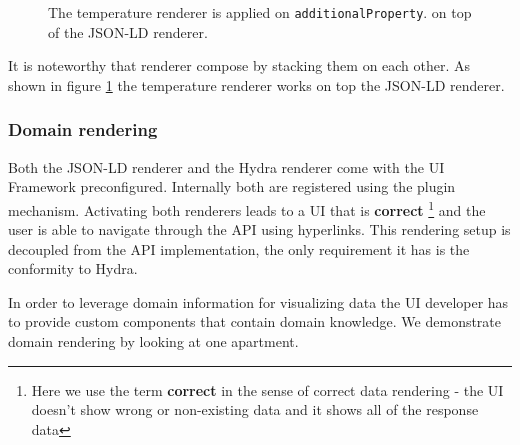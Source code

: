\begin{figure}[!htb]
  \caption{The temperature renderer is applied on \lstinline{additionalProperty}. on top of the JSON-LD renderer.}
  \label{fig:temperature}
\end{figure}

It is noteworthy that renderer compose by stacking them on each other. As shown in figure \ref{fig:temperature} the temperature renderer works on top the JSON-LD renderer.

\subsubsection{Domain rendering}
Both the JSON-LD renderer and the Hydra renderer come with the UI Framework preconfigured. Internally both are registered using the plugin mechanism. Activating both renderers leads to a UI that is \textbf{correct} \footnote{Here we use the term \textbf{correct} in the sense of correct data rendering - the UI doesn't show wrong or non-existing data and it shows all of the response data} and the user is able to navigate through the API using hyperlinks. This rendering setup is decoupled from the API implementation, the only requirement it has is the conformity to Hydra.

In order to leverage domain information for visualizing data the UI developer has to provide custom components that contain domain knowledge. We demonstrate domain rendering by looking at one apartment.

